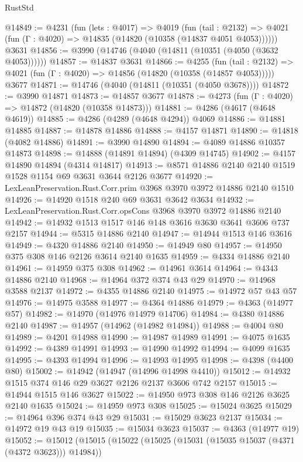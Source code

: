 \begin{lexlean}{RustStd}
\begin{coremodule}
{\begin{coremodule}
{{{{{{{{{{{{{{{{@14849 := @4231
    (fun (lets : @4017) =>
    @4019
      (fun (tail : @2132) =>
      @4021 (fun (Γ : @4020) => @14835 (@14820 (@10358 (@14837 @4051 @4053))))))
    @3631
@14856 := @3990 (@14746 (@4040 (@14811 (@10351 (@4050 (@3632 @4053))))))
@14857 := @14837 @3631
@14866 := @4255
    (fun (tail : @2132) => @4021 (fun (Γ : @4020) => @14856 (@14820 (@10358 (@14857 @4053)))))
    @3677
@14871 := @14746 (@4040 (@14811 (@10351 (@4050 @3678))))
@14872 := @3990 @14871
@14873 := @14857 @3677
@14878 := @4273 (fun (Γ : @4020) => @14872 (@14820 (@10358 @14873)))
@14881 := @4286 (@4617 (@4648 @4619))
@14885 := @4286 (@4289 (@4648 @4294)) @4069
@14886 := @14881 @14885
@14887 := @14878 @14886
@14888 := @4157 @14871
@14890 := @14818 (@4082 @14886)
@14891 := @3990 @14890
@14894 := @4089 @14886 @10357 @14873
@14898 := @14888 (@14891 @14894) (@4309 @14745)
@14902 := @4157 @14890 @14894 (@4314 @14817)
@14913 := @8571 @14886 @2140 @2140 @1519 @1528 @1154 @69 @3631 @3644 @2126 @3677
@14920 := LexLeanPreservation.Rust.Corr.prim @3968 @3970 @3972 @14886 @2140 @1510
@14926 := @14920 @1518 @240 @69 @3631 @3642 @3634
@14932 := LexLeanPreservation.Rust.Corr.opsCons @3968 @3970 @3972 @14886 @2140
@14942 := @14932 @1513 @1517 @146 @148 @3616 @3630 @3641 @3606 @737 @2157
@14944 := @5315 @14886 @2140
@14947 := @14944 @1513 @146 @3616
@14949 := @4320 @14886 @2140
@14950 := @14949 @80
@14957 := @14950 @375 @308 @146 @2126 @3614 @2140 @1635
@14959 := @4334 @14886 @2140
@14961 := @14959 @375 @308
@14962 := @14961 @3614
@14964 := @4343 @14886 @2140
@14968 := @14964 @372 @374 @43 @29
@14970 := @14968 @3588 @2137
@14972 := @4355 @14886 @2140
@14975 := @14972 @57 @43 @57
@14976 := @14975 @3588
@14977 := @4364 @14886
@14979 := @4363 (@14977 @57)
@14982 := @14970 (@14976 @14979 @14706)
@14984 := @4380 @14886 @2140
@14987 := @14957 (@14962 (@14982 @14984))
@14988 := @4004 @80
@14989 := @4201 @14988
@14990 := @14987 @14989
@14991 := @4075 @1635
@14992 := @4389 @14991
@14993 := @14990 @14992
@14994 := @4099 @1635
@14995 := @4393 @14994
@14996 := @14993 @14995
@14998 := @4398 (@4400 @80)
@15002 := @14942 (@14947 (@14996 @14998 @4410))
@15012 := @14932 @1515 @374 @146 @29 @3627 @2126 @2137 @3606 @742 @2157
@15015 := @14944 @1515 @146 @3627
@15022 := @14950 @973 @308 @146 @2126 @3625 @2140 @1635
@15024 := @14959 @973 @308
@15025 := @15024 @3625
@15029 := @14964 @396 @374 @43 @29
@15031 := @15029 @3623 @2137
@15034 := @14972 @19 @43 @19
@15035 := @15034 @3623
@15037 := @4363 (@14977 @19)
@15052 := @15012
    (@15015
      (@15022
        (@15025 (@15031 (@15035 @15037 (@4371 (@4372 @3623))) @14984))
}}}}}}}}}}}}}}}}
\end{coremodule}}
\end{coremodule}
\end{lexlean}

